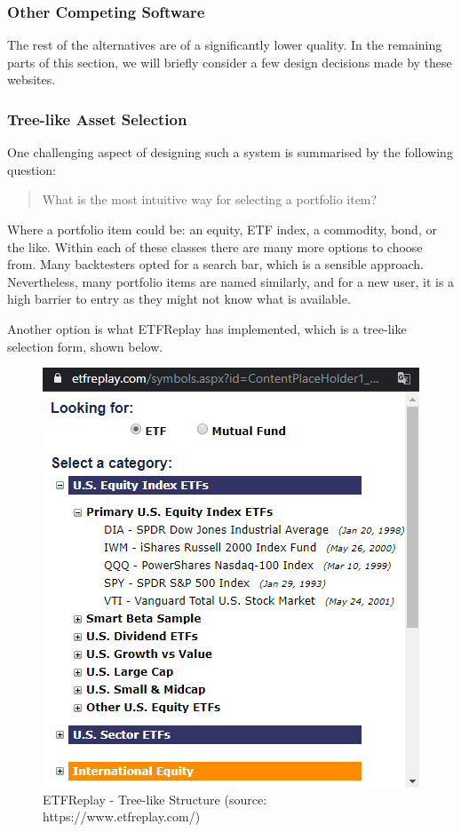 \documentclass[main.tex]{subfiles}
\begin{document}
\subsubsection{Other Competing Software}

The rest of the alternatives are of a significantly lower quality. In the remaining parts of this section, we will briefly consider a few design decisions made by these websites.

\subsubsection*{Tree-like Asset Selection}

One challenging aspect of designing such a system is summarised by the following question: 

\begin{quote}
    What is the most intuitive way for selecting a portfolio item? 
\end{quote}

Where a portfolio item could be: an equity, ETF index, a commodity, bond, or the like. Within each of these classes there are many more options to choose from. Many backtesters opted for a search bar, which is a sensible approach. Nevertheless, many portfolio items are named similarly, and for a new user, it is a high barrier to entry as they might not know what is available. 

Another option is what ETFReplay \cite{etfreplay} has implemented, which is a tree-like selection form, shown below. 

\begin{figure}[H]
   \centering
   \includegraphics[scale=0.7]{02Background/02Pictures/etfreplay.png}
   \caption{ETFReplay - Tree-like Structure (source: https://www.etfreplay.com/)}
\end{figure}
\end{document}

